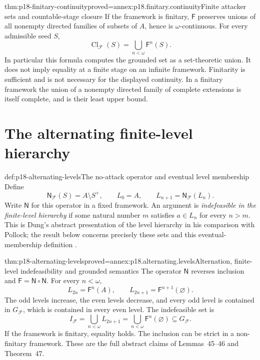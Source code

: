 \begin{hbtheorem}{thm:p18-finitary-continuity}{proved=annex:p18.finitary.continuity}{Finite attacker sets and countable-stage closure}
If the framework is finitary, \(\mathsf F\) preserves
unions of all nonempty directed families of subsets
of \(A\), hence is \(\omega\)-continuous. For every
admissible seed \(S\),
\[
                 \operatorname{Cl}_{\mathcal F}(S)
                      =\bigcup_{n<\omega}\mathsf F^n(S).
\]
In particular this formula computes the grounded set
as a set-theoretic union. It does not imply equality
at a finite stage on an infinite framework.
Finitarity is sufficient and is not necessary for
the displayed continuity.
In a finitary framework the union of a nonempty
directed family of complete extensions is itself
complete, and is their least upper bound.
\end{hbtheorem}

\section{The alternating finite-level hierarchy}

\begin{hbdefinition}{def:p18-alternating-levels}{The no-attack operator and eventual level membership}
Define
\[
 \mathsf N_{\mathcal F}(S)=A\setminus S^+,\qquad
 L_0=A,\qquad L_{n+1}=\mathsf N_{\mathcal F}(L_n).
\]
Write \(\mathsf N\) for this operator in a fixed framework.
An argument is \emph{indefeasible in the finite-level
hierarchy} if some natural number \(m\) satisfies
\(a\in L_n\) for every \(n>m\).
This is Dung's abstract presentation of the
level hierarchy in his comparison with Pollock;
the result below concerns precisely these
sets and this eventual-membership definition
\cite[sec.~4.2, definition~44, pp.~341--342]{Dung1995}.
\end{hbdefinition}

\begin{hbtheorem}{thm:p18-alternating-levels}{proved=annex:p18.alternating.levels}{Alternation, finite-level indefeasibility and grounded semantics}
The operator \(\mathsf N\) reverses inclusion and
\(\mathsf F=\mathsf N\circ\mathsf N\).
For every \(n<\omega\),
\[
 L_{2n}=\mathsf F^n(A),\qquad
 L_{2n+1}=\mathsf F^{n+1}(\varnothing).
\]
The odd levels increase, the even levels decrease,
and every odd level is contained in
\(G_{\mathcal F}\), which is contained in
every even level. The indefeasible set is
\[
 I_{\mathcal F}=\bigcup_{n<\omega}L_{2n+1}
               =\bigcup_{n<\omega}\mathsf F^n(\varnothing)
               \subseteq G_{\mathcal F}.
\]
If the framework is finitary, equality holds.
The inclusion can be strict in a non-finitary
framework. These are the full abstract
claims of Lemmas~45--46 and Theorem~47.
\end{hbtheorem}

